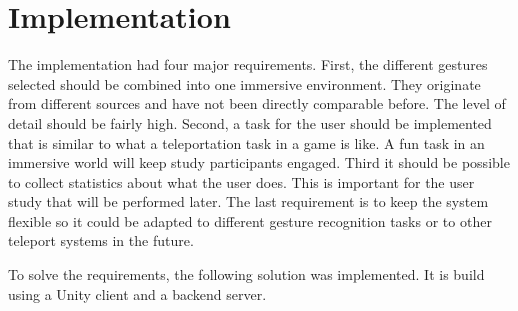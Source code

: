 \chapter{Implementation}
The implementation had four major requirements. First, the different gestures selected should be combined into one immersive environment. They originate from different sources and have not been directly comparable before. The level of detail should be fairly high. Second, a task for the user should be implemented that is similar to what a teleportation task in a game is like. A fun task in an immersive world will keep study participants engaged. Third it should be possible to collect statistics about what the user does. This is important for the user study that will be performed later. The last requirement is to keep the system flexible so it could be adapted to different gesture recognition tasks or to other teleport systems in the future.

To solve the requirements, the following solution was implemented. It is build using a Unity client and a backend server.